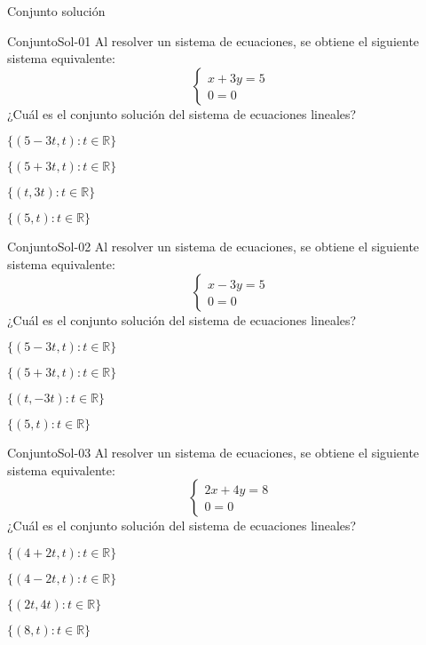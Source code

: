 \documentclass[a4,11pt]{aleph-notas}
\begin{document}
\begin{quiz}{Conjunto solución}
    
\begin{multi}[]%
    {ConjuntoSol-01}
    Al resolver un sistema de ecuaciones, se obtiene el siguiente sistema equivalente:
    \[
        \begin{cases}
            x + 3y = 5 \\
            0 = 0
        \end{cases}
    \]
    ¿Cuál es el conjunto solución del sistema de ecuaciones lineales?
    \item* $\{(5-3t, t) : t\in \mathbb{R}\}$
    \item $\{(5+3t, t) : t\in \mathbb{R}\}$
    \item $\{(t, 3t) : t\in \mathbb{R}\}$
    \item $\{(5, t) : t\in \mathbb{R}\}$
\end{multi}

\begin{multi}[]%
    {ConjuntoSol-02}
    Al resolver un sistema de ecuaciones, se obtiene el siguiente sistema equivalente:
    \[
        \begin{cases}
            x - 3y = 5 \\
            0 = 0
        \end{cases}
    \]
    ¿Cuál es el conjunto solución del sistema de ecuaciones lineales?
    \item $\{(5-3t, t) : t\in \mathbb{R}\}$
    \item* $\{(5+3t, t) : t\in \mathbb{R}\}$
    \item $\{(t, -3t) : t\in \mathbb{R}\}$
    \item $\{(5, t) : t\in \mathbb{R}\}$
\end{multi}

\begin{multi}[]%
    {ConjuntoSol-03}
    Al resolver un sistema de ecuaciones, se obtiene el siguiente sistema equivalente:
    \[
        \begin{cases}
            2x + 4y = 8 \\
            0 = 0
        \end{cases}
    \]
    ¿Cuál es el conjunto solución del sistema de ecuaciones lineales?
    \item $\{(4+2t, t) : t\in \mathbb{R}\}$
    \item* $\{(4-2t, t) : t\in \mathbb{R}\}$
    \item $\{(2t, 4t) : t\in \mathbb{R}\}$
    \item $\{(8, t) : t\in \mathbb{R}\}$
\end{multi}


\end{quiz}
\end{document}
